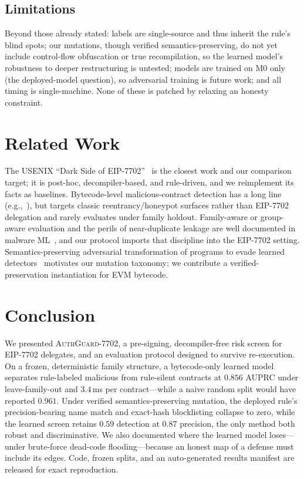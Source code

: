 \documentclass[conference]{IEEEtran}
\newcommand{\tool}{\textsc{AuthGuard-7702}}
\newcommand{\eip}{EIP-7702}
\begin{document}
\subsection{Limitations}
Beyond those already stated: labels are single-source and thus inherit the rule's blind spots;
our mutations, though verified semantics-preserving, do not yet include control-flow
obfuscation or true recompilation, so the learned model's robustness to deeper restructuring is
untested; models are trained on M0 only (the deployed-model question), so adversarial training is
future work; and all timing is single-machine. None of these is patched by relaxing an honesty
constraint.

\section{Related Work}
\label{sec:related}
The USENIX ``Dark Side of \eip{}''~\cite{darkside} is the closest work and our comparison
target; it is post-hoc, decompiler-based, and rule-driven, and we reimplement its facts as
baselines. Bytecode-level malicious-contract detection has a long line
(e.g.,~\cite{honeybadger,maian,contractward,eswaran}), but targets classic reentrancy/honeypot
surfaces rather than \eip{} delegation and rarely evaluates under family holdout. Family-aware or
group-aware evaluation and the perils of near-duplicate leakage are well documented in malware
ML~\cite{tesseract,pendlebury}, and our protocol imports that discipline into the \eip{} setting.
Semantics-preserving adversarial transformation of programs to evade learned
detectors~\cite{advmalware,pierazzi} motivates our mutation taxonomy; we contribute a
verified-preservation instantiation for EVM bytecode.

\section{Conclusion}
\label{sec:conclusion}
We presented \tool{}, a pre-signing, decompiler-free risk screen for \eip{} delegates, and an
evaluation protocol designed to survive re-execution. On a frozen, deterministic family
structure, a bytecode-only learned model separates rule-labeled malicious from rule-silent
contracts at $0.856$ AUPRC under leave-family-out and $3.4$\,ms per contract---while a naive
random split would have reported $0.961$. Under verified semantics-preserving mutation, the
deployed rule's precision-bearing name match and exact-hash blocklisting collapse to zero, while
the learned screen retains $0.59$ detection at $0.87$ precision, the only method both robust and
discriminative. We also documented where the learned model loses---under brute-force dead-code
flooding---because an honest map of a defense must include its edges. Code, frozen splits, and an
auto-generated results manifest are released for exact reproduction.
\end{document}
